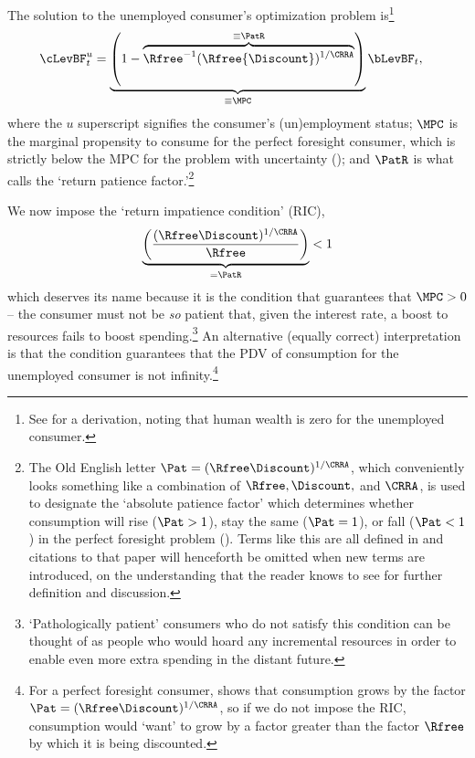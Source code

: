 \documentclass{handout}
\begin{document}
\renewcommand{\MPCU}{\MPC} %
The solution to the unemployed consumer's optimization problem
is\footnote{See  for a derivation, noting that human wealth is zero for the unemployed consumer.} 
\begin{equation}\begin{gathered}\begin{aligned}
        \cLevBF^{u}_{t} & =  \underbrace{\left(1-\overbrace{\Rfree ^{-1}(\Rfree{\Discount})^{1/\CRRA}}^{\equiv \PatR}\right)}_{\equiv \MPCU} \bLevBF_{t} \label{eq:cpfinfhorunemp} %
,
\end{aligned}\end{gathered}\end{equation}
where the $u$ superscript signifies the consumer's (un)employment
status; $\MPCU$ is the marginal propensity to consume for the perfect
foresight consumer, which is strictly below the MPC for the problem
with uncertainty (\cite{carroll&kimball:concavity}); and $\PatR$ is
what \cite{BufferStockTheory} calls the `return patience factor.'\footnote{The Old English letter $\Pat = (\Rfree \Discount)^{1/\CRRA}$, which conveniently looks something like a combination of $\Rfree, \Discount, $ and $\CRRA$, is used to designate the `absolute patience factor' which determines whether consumption will rise ($\Pat > 1$), stay the same ($\Pat = 1$), or fall ($\Pat < 1$) in the perfect foresight problem ().  Terms like this are all defined in \cite{carrollBSTheory} and citations to that paper will henceforth be omitted when new terms are introduced, on the understanding that the reader knows to see \cite{carrollBSTheory} for further definition and discussion.}


\indent We now impose the `return impatience condition' (RIC),
\begin{equation}\begin{gathered}\begin{aligned}
  \underbrace{\left(\frac{(\Rfree \Discount)^{1/\CRRA}}{\Rfree}\right)}_{= \PatR} < 1 \label{eq:RIC}
\end{aligned}\end{gathered}\end{equation}
which deserves its name because it is the condition that guarantees that $\MPCU
> 0$ -- the consumer must not be {\it so} patient that, given the interest rate, a boost to
resources fails to boost spending.\footnote{`Pathologically patient' consumers who do not satisfy this condition can be thought of as people who would hoard any incremental resources in order to enable even more extra spending in the distant future.}
An alternative (equally correct)
interpretation is that the condition guarantees that the PDV of
consumption for the unemployed consumer is not infinity.\footnote{For a perfect
foresight consumer,  shows that consumption grows by the factor
$\Pat = (\Rfree\Discount)^{1/\CRRA}$, so if we do not impose the RIC, consumption would `want' to grow by
a factor greater than the factor $\Rfree$ by which it is being
discounted.}  
\end{document}
